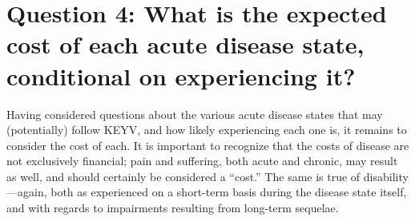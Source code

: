 \documentclass[12pt]{article}
\newcommand{\cjh}{\textcolor{blue}{cjh}}
\newcommand{\tjh}{\textcolor{red}{tjh}}
\newcommand{\msg}[3]{(#1 $\rightarrow$ #2: #3)}
\newcommand{\mcc}[1]{\msg\cjh\cjh{#1}}
\newcommand{\mtc}[1]{\msg\tjh\cjh{#1}}
\begin{document}
    \section[Expected costs, given diseases]{Question 4: What is the expected cost of each acute disease state, conditional on experiencing it?}
        \label{costs}
        Having considered questions about the various acute disease states that may (potentially) follow KEYV, and how likely experiencing each one is, it remains to consider the cost of each. It is important to recognize that the costs of disease are not exclusively financial; pain and suffering, both acute and chronic, may result as well, and should certainly be considered a ``cost.'' The same is true of disability---again, both as experienced on a short-term basis during the disease state itself, and with regards to impairments resulting from long-term sequelae.

        
\end{document}
